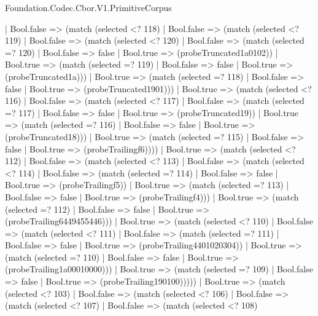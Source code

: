 \begin{lexlean}{Foundation.Codec.Cbor.V1.PrimitiveCorpus}
\begin{semanticmodule}
{            | Bool.false => (match (selected <? 118)
              | Bool.false => (match (selected <? 119)
                | Bool.false => (match (selected <? 120)
                  | Bool.false => (match (selected =? 120)
                    | Bool.false => false
                    | Bool.true => (probeTruncated1a0102))
                  | Bool.true => (match (selected =? 119)
                    | Bool.false => false
                    | Bool.true => (probeTruncated1a)))
                | Bool.true => (match (selected =? 118)
                  | Bool.false => false
                  | Bool.true => (probeTruncated1901)))
              | Bool.true => (match (selected <? 116)
                | Bool.false => (match (selected <? 117)
                  | Bool.false => (match (selected =? 117)
                    | Bool.false => false
                    | Bool.true => (probeTruncated19))
                  | Bool.true => (match (selected =? 116)
                    | Bool.false => false
                    | Bool.true => (probeTruncated18)))
                | Bool.true => (match (selected =? 115)
                  | Bool.false => false
                  | Bool.true => (probeTrailingf6))))
            | Bool.true => (match (selected <? 112)
              | Bool.false => (match (selected <? 113)
                | Bool.false => (match (selected <? 114)
                  | Bool.false => (match (selected =? 114)
                    | Bool.false => false
                    | Bool.true => (probeTrailingf5))
                  | Bool.true => (match (selected =? 113)
                    | Bool.false => false
                    | Bool.true => (probeTrailingf4)))
                | Bool.true => (match (selected =? 112)
                  | Bool.false => false
                  | Bool.true => (probeTrailing6449455446)))
              | Bool.true => (match (selected <? 110)
                | Bool.false => (match (selected <? 111)
                  | Bool.false => (match (selected =? 111)
                    | Bool.false => false
                    | Bool.true => (probeTrailing4401020304))
                  | Bool.true => (match (selected =? 110)
                    | Bool.false => false
                    | Bool.true => (probeTrailing1a00010000)))
                | Bool.true => (match (selected =? 109)
                  | Bool.false => false
                  | Bool.true => (probeTrailing190100)))))
          | Bool.true => (match (selected <? 103)
            | Bool.false => (match (selected <? 106)
              | Bool.false => (match (selected <? 107)
                | Bool.false => (match (selected <? 108)
}
\end{semanticmodule}
\end{lexlean}
